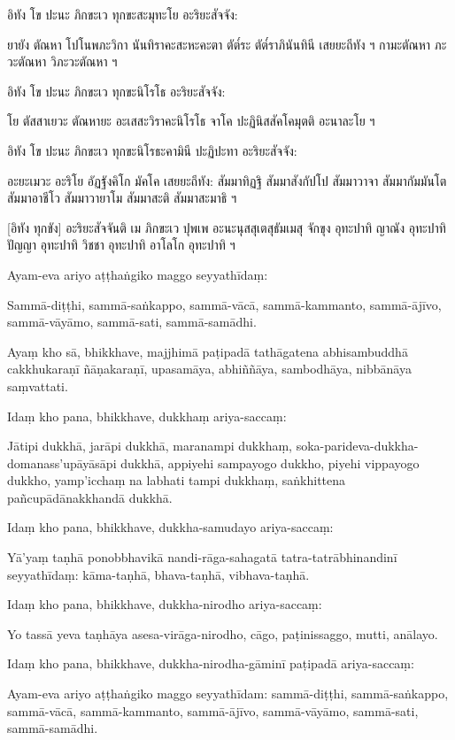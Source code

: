 \documentclass[
  babelLanguage=thai,
  final,
]{chantingbook}
\begin{document}
อิทัง โข ปะนะ ภิกขะเว ทุกขะสะมุทะโย อะริยะสัจจัง:

ยายัง ตัณหา โปโนพภะวิกา นันทิราคะสะหะคะตา ตัต๎ระ ตัต๎ราภินันทินี
เสยยะถีทัง ฯ กามะตัณหา ภะวะตัณหา วิภะวะตัณหา ฯ

อิทัง โข ปะนะ ภิกขะเว ทุกขะนิโรโธ อะริยะสัจจัง: 

โย ตัสสาเยวะ ตัณหายะ อะเสสะวิราคะนิโรโธ จาโค ปะฏินิสสัคโคมุตติ อะนาละโย ฯ

อิทัง โข ปะนะ ภิกขะเว ทุกขะนิโรธะคามินี ปะฏิปะทา อะริยะสัจจัง:

อะยะเมวะ อะริโย อัฏฐังคิโก มัคโค เสยยะถีทัง: สัมมาทิฏฐิ สัมมาสังกัปโป
สัมมาวาจา สัมมากัมมันโต สัมมาอาชีโว สัมมาวายาโม สัมมาสะติ สัมมาสะมาธิ ฯ

[อิทัง ทุกขัง] อะริยะสัจจันติ เม ภิกขะเว ปุพเพ อะนะนุสสุเตสุธัมเมสุ จักขุง
อุทะปาทิ ญาณัง อุทะปาทิ ปัญญา อุทะปาทิ วิชชา อุทะปาทิ อาโลโก อุทะปาทิ ฯ

\clearpage

\paliText
\markboth{\paliTitle}{\rightmark}

Ayam-eva ariyo aṭṭhaṅgiko maggo seyyathīdaṃ:

Sammā-diṭṭhi, sammā-saṅkappo, sammā-vācā, sammā-kammanto, sammā-ājīvo,
sammā-vāyāmo, sammā-sati, sammā-samādhi.

Ayaṃ kho sā, bhikkhave, majjhimā paṭipadā tathāgatena abhisambuddhā
cakkhukaraṇī ñāṇakaraṇī, upasamāya, abhiññāya, sambodhāya, nibbānāya
saṃvattati.

Idaṃ kho pana, bhikkhave, dukkhaṃ ariya-saccaṃ:

Jātipi dukkhā, jarāpi dukkhā, maranampi dukkhaṃ,
soka-parideva-dukkha-domanass'upāyāsāpi dukkhā, appiyehi sampayogo
dukkho, piyehi vippayogo dukkho, yamp'icchaṃ na labhati tampi dukkhaṃ,
saṅkhittena pañcupādānakkhandā dukkhā.

Idaṃ kho pana, bhikkhave, dukkha-samudayo ariya-saccaṃ:

Yā'yaṃ taṇhā ponobbhavikā nandi-rāga-sahagatā tatra-tatrābhinandinī
seyyathīdaṃ: kāma-taṇhā, bhava-taṇhā, vibhava-taṇhā.

Idaṃ kho pana, bhikkhave, dukkha-nirodho ariya-saccaṃ:

Yo tassā yeva taṇhāya asesa-virāga-nirodho, cāgo, paṭinissaggo, mutti,
anālayo.

Idaṃ kho pana, bhikkhave, dukkha-nirodha-gāminī paṭipadā ariya-saccaṃ:

Ayam-eva ariyo aṭṭhaṅgiko maggo seyyathīdam: sammā-diṭṭhi,
sammā-saṅkappo, sammā-vācā, sammā-kammanto, sammā-ājīvo, sammā-vāyāmo,
sammā-sati, sammā-samādhi.
\end{document}
